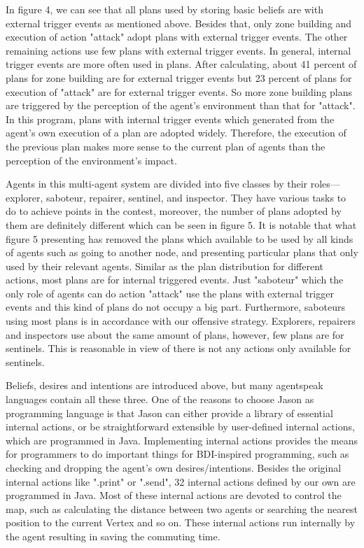 \documentclass{llncs}
\begin{document}
In figure 4, we can see that all plans used by storing basic beliefs are with external trigger events as mentioned above. Besides that, only zone building and execution of action "attack" adopt plans with external trigger events. The other remaining actions use few plans with external trigger events. In general, internal trigger events are more often used in plans. After calculating, about 41 percent of plans for zone building are for external trigger events but 23 percent of plans for execution of "attack" are for external trigger events. So more zone building plans are triggered by the perception of the agent’s environment than that for "attack". In this program, plans with internal trigger events which generated from the agent’s own execution of a plan are adopted widely. Therefore, the execution of the previous plan makes more sense to the current plan of agents than the perception of the environment's impact.

Agents in this multi-agent system are divided into five classes by their roles---explorer, saboteur, repairer, sentinel, and inspector. They have various tasks to do to achieve points in the contest, moreover, the number of plans adopted by them are definitely different which can be seen in figure 5. It is notable that what figure 5 presenting has removed the plans which available to be used by all kinds of agents such as going to another node, and presenting particular plans that only used by their relevant agents. Similar as the plan distribution for different actions, most plans are for internal triggered events. Just "saboteur" which the only role of agents can do action "attack" use the plans with external trigger events and this kind of plans do not occupy a big part.
Furthermore, saboteurs using most plans is in accordance with our offensive strategy. Explorers, repairers and inspectors use about the same amount of plans, however, few plans are for sentinels. This is reasonable in view of there is not any actions only available for sentinels.

Beliefs, desires and intentions are introduced above, but many agentspeak languages contain all these three. One of the reasons to choose Jason as programming language is that Jason can either provide a library of essential internal actions, or be straightforward extensible by user-defined internal actions, which are programmed in Java\cite{rafael_Javabased_2007}. Implementing internal actions provides the means for programmers to do important things for BDI-inspired programming, such as checking and dropping the agent’s own
desires/intentions\cite{rafael_overviewjason_2006}. Besides the original internal actions like ".print" or ".send", 32 internal actions defined by our own are programmed in Java. Most of these internal actions are devoted to control the map, such as calculating the distance between two agents or searching the nearest position to the current Vertex and so on. These internal actions run internally by the agent resulting in saving the commuting time.
\end{document}
